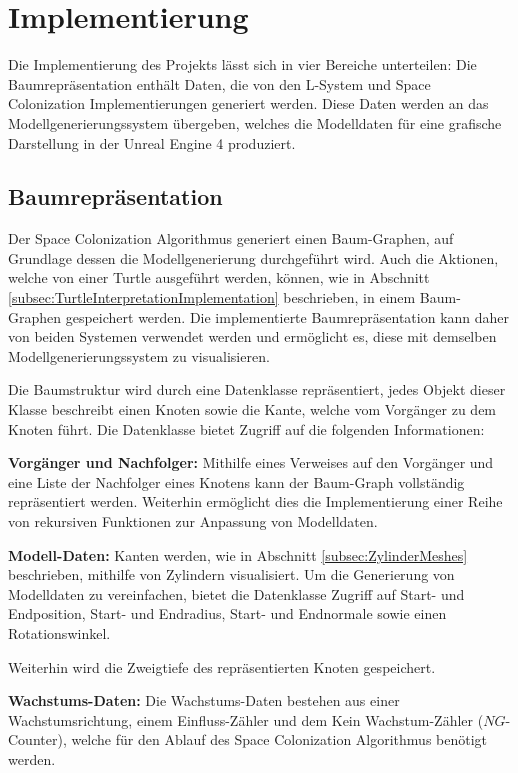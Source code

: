 \chapter{Implementierung}


Die Implementierung des Projekts lässt sich in vier Bereiche unterteilen: Die Baumrepräsentation enthält Daten, die von den L-System und Space Colonization Implementierungen generiert werden. Diese Daten werden an das Modellgenerierungssystem übergeben, welches die Modelldaten für eine grafische Darstellung in der Unreal Engine 4 produziert.


\section{Baumrepräsentation}

Der Space Colonization Algorithmus generiert einen Baum-Graphen, auf Grundlage dessen die Modellgenerierung durchgeführt wird. Auch die Aktionen, welche von einer Turtle ausgeführt werden, können, wie in Abschnitt \ref{subsec:TurtleInterpretationImplementation} beschrieben, in einem Baum-Graphen gespeichert werden. Die implementierte Baumrepräsentation kann daher von beiden Systemen verwendet werden und ermöglicht es, diese mit demselben Modellgenerierungssystem zu visualisieren.

Die Baumstruktur wird durch eine Datenklasse repräsentiert, jedes Objekt dieser Klasse beschreibt einen Knoten sowie die Kante, welche vom Vorgänger zu dem Knoten führt. Die Datenklasse bietet Zugriff auf die folgenden Informationen:

\begin{description}
	\item \textbf{Vorgänger und Nachfolger:} Mithilfe eines Verweises auf den Vorgänger und eine Liste der Nachfolger eines Knotens kann der Baum-Graph vollständig repräsentiert werden. Weiterhin ermöglicht dies die Implementierung einer Reihe von rekursiven Funktionen zur Anpassung von Modelldaten.\\
	
	\item \textbf{Modell-Daten:} Kanten werden, wie in Abschnitt \ref{subsec:ZylinderMeshes} beschrieben, mithilfe von Zylindern visualisiert. Um die Generierung von Modelldaten zu vereinfachen, bietet die Datenklasse Zugriff auf Start- und Endposition, Start- und Endradius, Start- und Endnormale sowie einen Rotationswinkel. 
	
	Weiterhin wird die Zweigtiefe des repräsentierten Knoten gespeichert.\\
	
	\item \textbf{Wachstums-Daten:} Die Wachstums-Daten bestehen aus einer Wachstumsrichtung, einem Einfluss-Zähler und dem \glqq Kein Wachstum\grqq-Zähler ($NG$-Counter), welche für den Ablauf des Space Colonization Algorithmus benötigt werden.	
\end{description}

